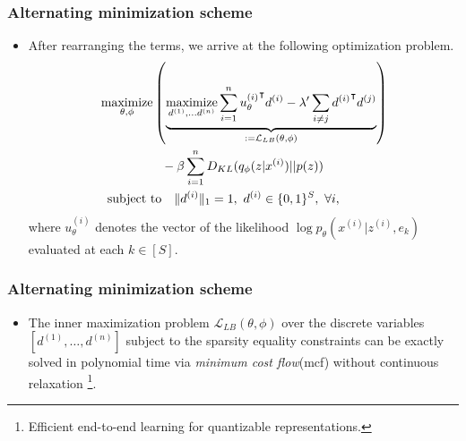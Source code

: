 \documentclass[10pt,mathserif]{beamer}
\begin{document}
\begin{frame}
\frametitle{Alternating minimization scheme}
\begin{itemize}
\item
    After rearranging the terms, we arrive at the following optimization problem.
\begin{align}
\label{eqn:master_eqn}
&\operatorname*{maximize}_{\theta, \phi} \left(\underbrace{\operatorname*{maximize}_{d^{(1)},\ldots d^{(n)}} \sum_{i=1}^n {u_\theta^{(i)}}^\intercal d^{(i)} - \lambda' \sum_{i\neq j} {d^{(i)}}^\intercal d^{(j)}}_{:= \mathcal{L}_{LB}(\theta, \phi)} \right)\nonumber\\
&\qquad\qquad\quad - \beta \sum_{i=1}^n D_{KL}(q_\phi(z|x^{(i)})||p(z))\nonumber\\
&\text{\ \  subject to }~~ \| d^{(i)} \|_1 = 1,~ d^{(i)} \in \{0,1\}^S,~ \forall i, \nonumber
\end{align}
where $u_\theta^{(i)}$ denotes the vector of the  likelihood $\log p_\theta(x^{(i)}|z^{(i)}, e_k)$ evaluated at each $k \in [S]$.
        
\end{itemize}
\end{frame}

\begin{frame}
\frametitle{Alternating minimization scheme}
\begin{itemize}
    \item The inner maximization problem $\mathcal{L}_{LB}(\theta, \phi)$  over the discrete variables $[d^{(1)},\ldots,d^{(n)}]$ subject to the sparsity equality constraints can be exactly solved in polynomial time via \emph{minimum cost flow}(mcf) without  continuous relaxation \footnote{ {\color{blue}{Jeong, Y. and Song, H. O.}} Efficient end-to-end learning for quantizable representations. {\color{gray}{ICML2018}} }. 
\end{itemize}
\end{frame}
\end{document}
